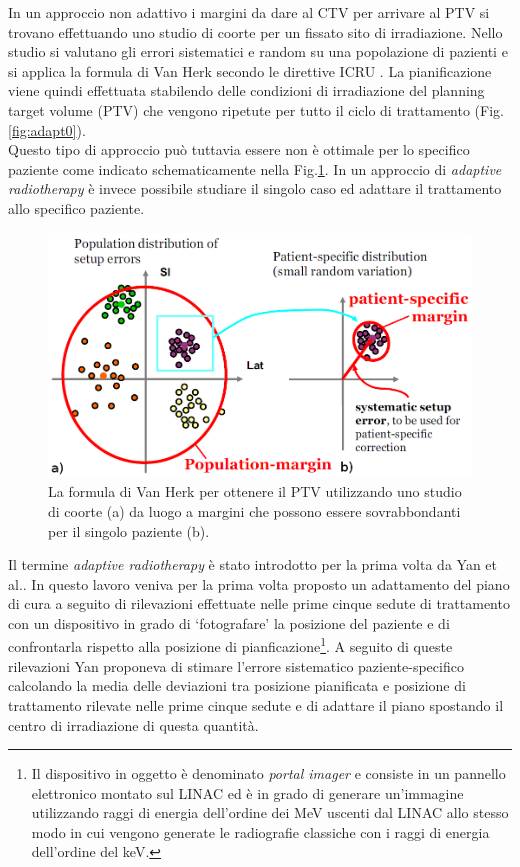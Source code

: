 In un approccio non adattivo i margini da dare al CTV per arrivare al PTV si trovano effettuando uno studio di coorte per un fissato sito di irradiazione. Nello studio si valutano gli errori sistematici e random su una popolazione di pazienti e si applica la formula di Van Herk secondo le direttive ICRU \cite{ICRU62}. La pianificazione viene quindi effettuata stabilendo delle condizioni di irradiazione del planning target volume (PTV)  che vengono ripetute per tutto il ciclo di trattamento (Fig.\ref{fig:adapt0}).\\
Questo tipo di approccio può tuttavia essere non è ottimale per lo specifico paziente come indicato schematicamente nella Fig.\ref{fig:margins}. In un approccio di \textit{adaptive radiotherapy} è invece possibile studiare il singolo caso ed adattare il trattamento allo specifico paziente.
\begin{figure}
\centering
\includegraphics[width=.8\textwidth]{./cap3/margins.png}
\caption{La formula di Van Herk per ottenere il PTV utilizzando uno studio di coorte (a) da luogo a margini che possono essere sovrabbondanti per il singolo paziente (b).}
\label{fig:margins}
\end{figure}

Il termine \textit{adaptive radiotherapy} è stato introdotto per la prima volta  da Yan et al.\cite{Yan1996}. In questo lavoro veniva per la prima volta proposto un adattamento del piano di cura a seguito di rilevazioni effettuate nelle prime cinque sedute di trattamento con un dispositivo in grado di `fotografare' la posizione del paziente e di confrontarla rispetto alla posizione di pianficazione\footnote{Il dispositivo in oggetto è denominato \textit{portal imager} e consiste in un pannello elettronico montato sul LINAC ed è in grado di generare un'immagine utilizzando raggi di energia dell'ordine dei MeV uscenti dal LINAC allo stesso modo in cui vengono generate le radiografie classiche con i raggi di energia dell'ordine del keV.}. A seguito di queste rilevazioni Yan proponeva di stimare l'errore sistematico paziente-specifico calcolando la media delle deviazioni tra posizione pianificata e posizione di trattamento rilevate nelle prime cinque sedute e di adattare il piano spostando il centro di irradiazione di questa quantità.

